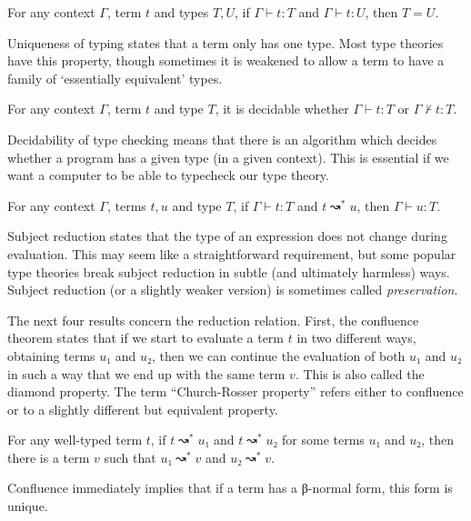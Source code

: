 \documentclass{article}
\theoremstyle{definition}
\begin{document}
\begin{theorem}
  For any context $Γ$, term $t$ and types $T,U$, if $Γ ⊢ t : T$ and $Γ ⊢ t : U$, then $T = U$.
\end{theorem}

Uniqueness of typing states that a term only has one type.
Most type theories have this property, though sometimes it is weakened to allow a term to have a family of \enquote*{essentially equivalent} types.

\begin{theorem}
  For any context $Γ$, term $t$ and type $T$, it is decidable whether $Γ ⊢ t : T$ or $Γ ⊬ t : T$.
\end{theorem}

Decidability of type checking means that there is an algorithm which decides whether a program has a given type (in a given context).
This is essential if we want a computer to be able to typecheck our type theory.

\begin{theorem}\label{th:subject-reduction}
  For any context $Γ$, terms $t,u$ and type $T$, if $Γ ⊢ t : T$ and $t ↝^{*} u$, then $Γ ⊢ u : T$.
\end{theorem}

Subject reduction states that the type of an expression does not change during evaluation.
This may seem like a straightforward requirement, but some popular type theories break subject reduction in subtle (and ultimately harmless) ways.
Subject reduction (or a slightly weaker version) is sometimes called \emph{preservation}.

The next four results concern the reduction relation.
First, the confluence theorem states that if we start to evaluate a term $t$ in two different ways, obtaining terms $u₁$ and $u₂$, then we can continue the evaluation of both $u₁$ and $u₂$ in such a way that we end up with the same term $v$.
This is also called the diamond property.
The term \enquote{Church-Rosser property} refers either to confluence or to a slightly different but equivalent property.

\begin{theorem}\label{th:confluence}
  For any well-typed term $t$, if $t ↝^{*} u₁$ and $t ↝^{*} u₂$ for some terms $u₁$ and $u₂$, then there is a term $v$ such that $u₁ ↝^{*} v$ and $u₂ ↝^{*} v$.
\end{theorem}

Confluence immediately implies that if a term has a β-normal form, this form is unique.
\end{document}
